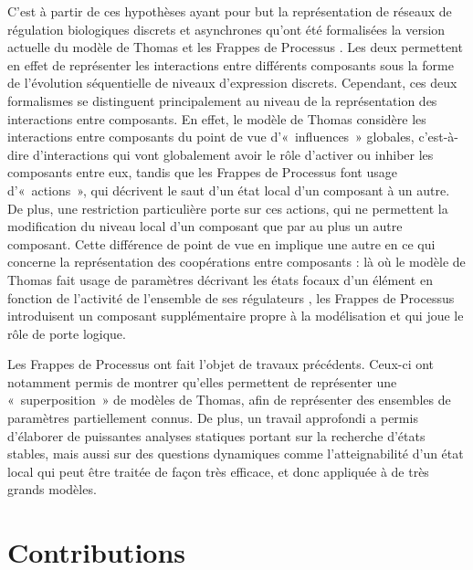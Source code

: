 C'est à partir de ces hypothèses
ayant pour but la représentation de réseaux de régulation biologiques discrets et asynchrones
qu'ont été formalisées
la version actuelle du modèle de Thomas \cite{Richard06}
et les Frappes de Processus \cite{PMR10-TCSB}.
Les deux permettent en effet de représenter les interactions entre différents composants
sous la forme de l'évolution séquentielle de niveaux d'expression discrets.
Cependant, ces deux formalismes se distinguent principalement au niveau de la représentation
des interactions entre composants.
En effet, le modèle de Thomas considère les interactions entre composants du point
de vue d'«~influences~» globales, c'est-à-dire d'interactions qui vont globalement avoir
le rôle d'activer ou inhiber les composants entre eux,
tandis que les Frappes de Processus font usage d'«~actions~»,
qui décrivent le saut d'un état local d'un composant à un autre.
De plus, une restriction particulière porte sur ces actions,
qui ne permettent la modification du niveau local d'un composant
que par au plus un autre composant.
Cette différence de point de vue en implique une autre en ce qui concerne la représentation
des coopérations entre composants :
là où le modèle de Thomas fait usage de paramètres décrivant
les états focaux d'un élément en fonction de l'activité de l'ensemble de ses régulateurs
\cite{Snoussi89},
les Frappes de Processus introduisent un composant supplémentaire propre à la modélisation
et qui joue le rôle de porte logique.

Les Frappes de Processus ont fait l'objet de travaux précédents.
Ceux-ci ont notamment permis de montrer qu'elles permettent de représenter une «~superposition~»
de modèles de Thomas, afin de représenter des ensembles de paramètres partiellement connus.
De plus, un travail approfondi a permis d'élaborer de puissantes analyses statiques
portant sur la recherche d'états stables,
mais aussi sur des questions dynamiques comme l'atteignabilité d'un état local \cite{PMR12-MSCS}
qui peut être traitée de façon très efficace, et donc appliquée à de très grands modèles.





\section{Contributions}

